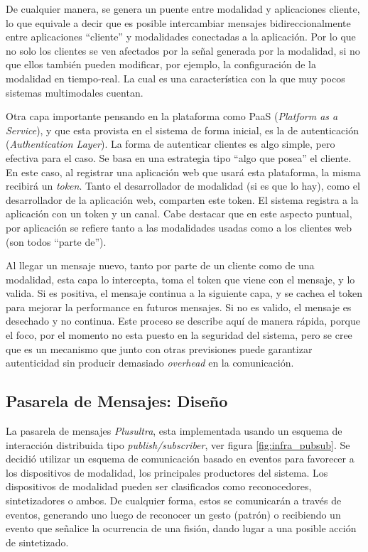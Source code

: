 De cualquier manera, se genera un puente entre modalidad y aplicaciones cliente, lo que equivale a decir que es posible intercambiar mensajes bidireccionalmente entre aplicaciones ``cliente'' y modalidades conectadas a la aplicación. Por lo que no solo los clientes se ven afectados por la señal generada por la modalidad, si no que ellos también pueden modificar, por ejemplo, la configuración de la modalidad en tiempo-real. La cual es una característica con la que muy pocos sistemas multimodales cuentan.

Otra capa importante pensando en la plataforma como PaaS (\emph{Platform as a Service}), y que esta provista en el sistema de forma inicial, es la de autenticación (\emph{Authentication Layer}). La forma de autenticar clientes es algo simple, pero efectiva para el caso. Se basa en una estrategia tipo ``algo que posea'' el cliente. En este caso, al registrar una aplicación web que usará esta plataforma, la misma recibirá un \emph{token}. Tanto el desarrollador de modalidad (si es que lo hay), como el desarrollador de la aplicación web, comparten este token. El sistema registra a la aplicación con un token y un canal. Cabe destacar que en este aspecto puntual, por aplicación se refiere tanto a las modalidades usadas como a los clientes web (son todos ``parte de'').

Al llegar un mensaje nuevo, tanto por parte de un cliente como de una modalidad, esta capa lo intercepta, toma el token que viene con el mensaje, y lo valida. Si es positiva, el mensaje continua a la siguiente capa, y se cachea el token para mejorar la performance en futuros mensajes. Si no es valido, el mensaje es desechado y no continua. Este proceso se describe aquí de manera rápida, porque el foco, por el momento no esta puesto en la seguridad del sistema, pero se cree que es un mecanismo que junto con otras previsiones puede garantizar autenticidad sin producir demasiado \emph{overhead} en la comunicación.

\subsection{Pasarela de Mensajes: Diseño} \label{sec:arq_ours_design}
La pasarela de mensajes \emph{Plusultra}, esta implementada usando un esquema de interacción distribuida tipo \emph{publish/subscriber}, ver figura \ref{fig:infra_pubsub}. Se decidió utilizar un esquema de comunicación basado en eventos para favorecer a los dispositivos de modalidad, los principales productores del sistema. Los dispositivos de modalidad pueden ser clasificados como reconocedores, sintetizadores o ambos. De cualquier forma, estos se comunicarán a través de eventos, \eg generando uno luego de reconocer un gesto (patrón) o recibiendo un evento que señalice la ocurrencia de una fisión, dando lugar a una posible acción de sintetizado.

